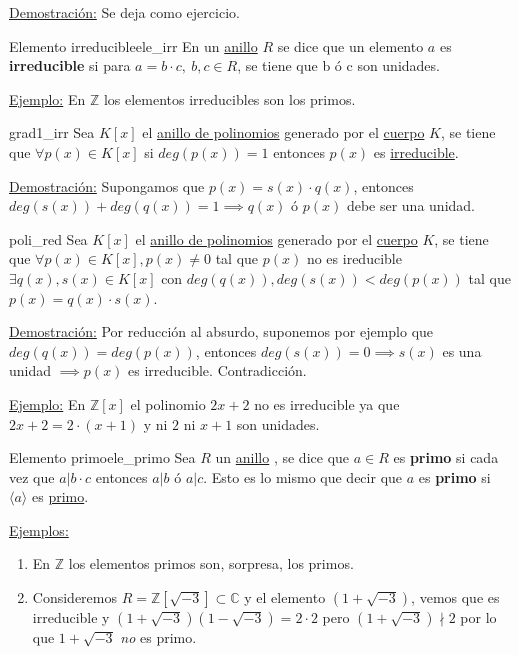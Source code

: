 \documentclass[10pt, a4paper]{article}
\newcommand{\Z}{\mathbb{Z}}
\newcommand{\C}{\mathbb{C}}
\newcommand{\ej}{\underline{Ejemplo:} }
\newcommand{\ejs}{\underline{Ejemplos:} }
\newcommand{\demo}{\underline{Demostración:} }
\newcommand{\anillo}[1][]{\hyperref[def:anillo]{anillo}#1 }
\newcommand{\cuerpo}[1][]{\hyperref[def:cuerpo]{cuerpo}#1 }
\newenvironment{enumeratea}{\begin{enumerate}[label=\arabic*)]}
{\end{enumerate}}
\begin{document}
\demo Se deja como ejercicio.

\begin{definition}{Elemento irreducible}{ele_irr}
En un \anillo $R$ se dice que un elemento $a$ es \textbf{irreducible} si para $a = b \cdot c,\ b, c \in R$, se tiene que b ó c son unidades.
\end{definition}

\ej En $\Z$ los elementos irreducibles son los primos.

\begin{proposition}{}{grad1_irr}
Sea $K[x]$ el \hyperref[def:anillopoli]{anillo de polinomios} generado por el \cuerpo $K$, se tiene que $\forall p(x) \in K[x]$ si $deg(p(x)) = 1$ entonces $p(x)$ es \hyperref[def:ele_irr]{irreducible}.
\end{proposition}

\demo Supongamos que $p(x) = s(x) \cdot q(x)$, entonces $deg(s(x)) + deg(q(x)) = 1 \implies q(x) \text{ ó } p(x)$ debe ser una unidad.

\begin{proposition}{}{poli_red}
Sea $K[x]$ el \hyperref[def:anillopoli]{anillo de polinomios} generado por el \cuerpo $K$, se tiene que $\forall p(x) \in K[x], p(x) \neq 0$ tal que $p(x)$ no es ireducible $\exists q(x), s(x) \in K[x]$ con $deg(q(x)), deg(s(x)) < deg(p(x))$ tal que $p(x) = q(x) \cdot s(x)$.
\end{proposition}

\demo Por reducción al absurdo, suponemos por ejemplo que $deg(q(x)) = deg(p(x))$, entonces $deg(s(x)) = 0 \implies s(x)$ es una unidad $\implies p(x)$ es irreducible. Contradicción.

\ej En $\Z[x]$ el polinomio $2x + 2$ no es irreducible ya que $2x + 2 = 2 \cdot (x + 1)$ y ni $2$ ni $x + 1$ son unidades.

\begin{definition}{Elemento primo}{ele_primo}
Sea $R$ un \anillo, se dice que $a \in R$ es \textbf{primo} si cada vez que $a | b \cdot c$ entonces $a | b$ ó $a | c$. Esto es lo mismo que decir que $a$ es \textbf{primo} si $\langle a \rangle$ es \hyperref[def:ideal_primo]{primo}.
\end{definition}

\ejs

\begin{enumeratea}
	\item En $\Z$ los elementos primos son, sorpresa, los primos.
	\item Consideremos $R = \Z[\sqrt{-3}] \subset \C$ y el elemento $(1 + \sqrt{-3})$, vemos que es irreducible y $(1 + \sqrt{-3})(1 - \sqrt{-3}) = 2 \cdot 2$ pero $(1 + \sqrt{-3}) \nmid 2$ por lo que $1 + \sqrt{-3}$ \emph{no} es primo.
\end{enumeratea}
\end{document}
